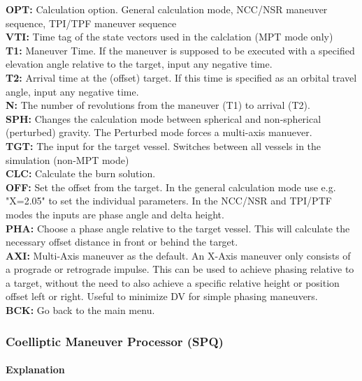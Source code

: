 \documentclass[11pt]{article} %
\begin{document}
\textbf{OPT:} Calculation option. General calculation mode, NCC/NSR maneuver sequence, TPI/TPF maneuver sequence\\
\textbf{VTI:} Time tag of the state vectors used in the calclation (MPT mode only)\\
\textbf{T1:} Maneuver Time. If the maneuver is supposed to be executed with a specified elevation angle relative to the target, input any negative time.\\
\textbf{T2:} Arrival time at the (offset) target. If this time is specified as an orbital travel angle, input any negative time.\\
\textbf{N:} The number of revolutions from the maneuver (T1) to arrival (T2).\\
\textbf{SPH:} Changes the calculation mode between spherical and non-spherical (perturbed) gravity. The Perturbed mode forces a multi-axis manuever.\\
\textbf{TGT:} The input for the target vessel. Switches between all vessels in the simulation (non-MPT mode)\\
\textbf{CLC:} Calculate the burn solution.\\
\textbf{OFF:} Set the offset from the target. In the general calculation mode use e.g. "X=2.05" to set the individual parameters. In the NCC/NSR and TPI/PTF modes the inputs are phase angle and delta height.\\
\textbf{PHA:} Choose a phase angle relative to the target vessel. This will calculate the necessary offset distance in front or behind the target.\\
\textbf{AXI:} Multi-Axis maneuver as the default. An X-Axis maneuver only consists of a prograde or retrograde impulse. This can be used to achieve phasing relative to a target, without the need to also achieve a specific relative height or position offset left or right. Useful to minimize DV for simple phasing maneuvers.\\
\textbf{BCK:} Go back to the main menu.\\

\newpage

\subsubsection{Coelliptic Maneuver Processor (SPQ)}

\paragraph{Explanation}\mbox{} \\
\end{document}
